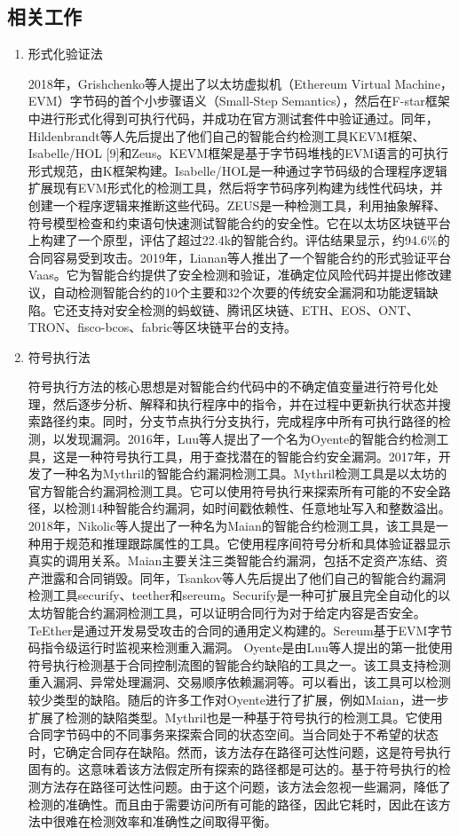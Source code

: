 \subsection{相关工作}
\begin{enumerate}[label=\textbf{\textit{\Alph*.}}, align=left]
    \item 形式化验证法
    
    2018年，Grishchenko等人\cite{grishchenko2018semantic}提出了以太坊虚拟机（Ethereum Virtual Machine，EVM）字节码的首个小步骤语义（Small-Step Semantics），然后在F-star框架中进行形式化得到可执行代码，并成功在官方测试套件中验证通过。同年，Hildenbrandt等人先后提出了他们自己的智能合约检测工具KEVM框架、Isabelle/HOL [9]和Zeus。KEVM框架是基于字节码堆栈的EVM语言的可执行形式规范，由K框架构建。Isabelle/HOL是一种通过字节码级的合理程序逻辑扩展现有EVM形式化的检测工具，然后将字节码序列构建为线性代码块，并创建一个程序逻辑来推断这些代码。ZEUS是一种检测工具，利用抽象解释、符号模型检查和约束语句快速测试智能合约的安全性。它在以太坊区块链平台上构建了一个原型，评估了超过22.4k的智能合约。评估结果显示，约94.6\%的合同容易受到攻击。2019年，Lianan等人推出了一个智能合约的形式验证平台Vaas。它为智能合约提供了安全检测和验证，准确定位风险代码并提出修改建议，自动检测智能合约的10个主要和32个次要的传统安全漏洞和功能逻辑缺陷。它还支持对安全检测的蚂蚁链、腾讯区块链、ETH、EOS、ONT、TRON、fisco-bcos、fabric等区块链平台的支持。
    \item 符号执行法
    
    符号执行方法的核心思想是对智能合约代码中的不确定值变量进行符号化处理，然后逐步分析、解释和执行程序中的指令，并在过程中更新执行状态并搜索路径约束。同时，分支节点执行分支执行，完成程序中所有可执行路径的检测，以发现漏洞。2016年，Luu等人提出了一个名为Oyente的智能合约检测工具，这是一种符号执行工具，用于查找潜在的智能合约安全漏洞。2017年，开发了一种名为Mythril的智能合约漏洞检测工具。Mythril检测工具是以太坊的官方智能合约漏洞检测工具。它可以使用符号执行来探索所有可能的不安全路径，以检测14种智能合约漏洞，如时间戳依赖性、任意地址写入和整数溢出。2018年，Nikolic等人提出了一种名为Maian的智能合约检测工具，该工具是一种用于规范和推理跟踪属性的工具。它使用程序间符号分析和具体验证器显示真实的调用关系。Maian主要关注三类智能合约漏洞，包括不定资产冻结、资产泄露和合同销毁。同年，Tsankov等人先后提出了他们自己的智能合约漏洞检测工具securify、teether和sereum。Securify是一种可扩展且完全自动化的以太坊智能合约漏洞检测工具，可以证明合同行为对于给定内容是否安全。TeEther是通过开发易受攻击的合同的通用定义构建的。Sereum基于EVM字节码指令级运行时监视来检测重入漏洞。
    Oyente是由Luu等人提出的第一批使用符号执行检测基于合同控制流图的智能合约缺陷的工具之一。该工具支持检测重入漏洞、异常处理漏洞、交易顺序依赖漏洞等。可以看出，该工具可以检测较少类型的缺陷。随后的许多工作对Oyente进行了扩展，例如Maian，进一步扩展了检测的缺陷类型。Mythril也是一种基于符号执行的检测工具。它使用合同字节码中的不同事务来探索合同的状态空间。当合同处于不希望的状态时，它确定合同存在缺陷。然而，该方法存在路径可达性问题，这是符号执行固有的。这意味着该方法假定所有探索的路径都是可达的。基于符号执行的检测方法存在路径可达性问题。由于这个问题，该方法会忽视一些漏洞，降低了检测的准确性。而且由于需要访问所有可能的路径，因此它耗时，因此在该方法中很难在检测效率和准确性之间取得平衡。
    

\end{enumerate}
